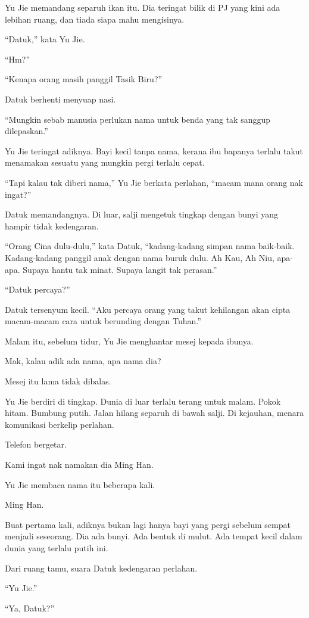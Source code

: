 \documentclass[
  11pt,
  a5paper,
  openany,
  oneside]{book}
\begin{document}
Yu Jie memandang separuh ikan itu. Dia teringat bilik di PJ yang kini
ada lebihan ruang, dan tiada siapa mahu mengisinya.

``Datuk,'' kata Yu Jie.

``Hm?''

``Kenapa orang masih panggil Tasik Biru?''

Datuk berhenti menyuap nasi.

``Mungkin sebab manusia perlukan nama untuk benda yang tak sanggup
dilepaskan.''

Yu Jie teringat adiknya. Bayi kecil tanpa nama, kerana ibu bapanya
terlalu takut menamakan sesuatu yang mungkin pergi terlalu cepat.

``Tapi kalau tak diberi nama,'' Yu Jie berkata perlahan, ``macam mana
orang nak ingat?''

Datuk memandangnya. Di luar, salji mengetuk tingkap dengan bunyi yang
hampir tidak kedengaran.

``Orang Cina dulu-dulu,'' kata Datuk, ``kadang-kadang simpan nama
baik-baik. Kadang-kadang panggil anak dengan nama buruk dulu. Ah Kau, Ah
Niu, apa-apa. Supaya hantu tak minat. Supaya langit tak perasan.''

``Datuk percaya?''

Datuk tersenyum kecil. ``Aku percaya orang yang takut kehilangan akan
cipta macam-macam cara untuk berunding dengan Tuhan.''

Malam itu, sebelum tidur, Yu Jie menghantar mesej kepada ibunya.

Mak, kalau adik ada nama, apa nama dia?

Mesej itu lama tidak dibalas.

Yu Jie berdiri di tingkap. Dunia di luar terlalu terang untuk malam.
Pokok hitam. Bumbung putih. Jalan hilang separuh di bawah salji. Di
kejauhan, menara komunikasi berkelip perlahan.

Telefon bergetar.

Kami ingat nak namakan dia Ming Han.

Yu Jie membaca nama itu beberapa kali.

Ming Han.

Buat pertama kali, adiknya bukan lagi hanya bayi yang pergi sebelum
sempat menjadi seseorang. Dia ada bunyi. Ada bentuk di mulut. Ada tempat
kecil dalam dunia yang terlalu putih ini.

Dari ruang tamu, suara Datuk kedengaran perlahan.

``Yu Jie.''

``Ya, Datuk?''
\end{document}
